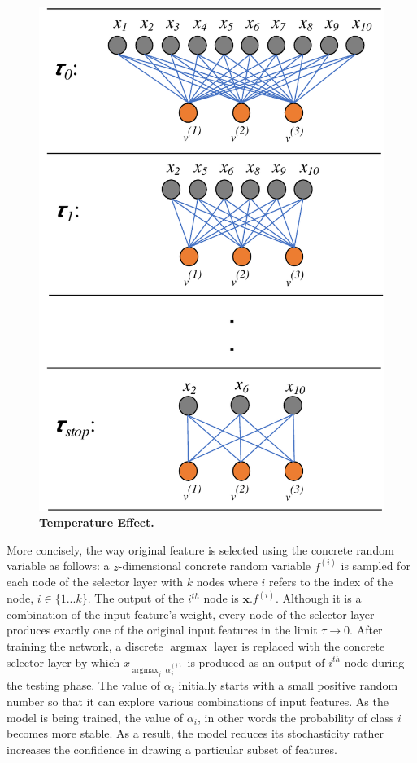 \documentclass{bioinfo}
\DeclareMathOperator*{\argmax}{argmax}
\begin{document}
\begin{figure}[hbt]
    \centering
    \includegraphics[scale=0.5]{fig/temp-change.pdf}
    \caption{\textbf{Temperature Effect.}  }
    \label{fig:temp-change}
\end{figure}
More concisely, the way original feature is selected using the concrete random variable as follows: a $z$-dimensional concrete random variable $f^{(i)}$ is sampled for each node of the selector layer with $k$ nodes where $i$ refers to the index of the node, $i \in \{1...k\}$. The output of the $i^{th}$ node is $ \textbf{x}.f^{(i)}$. Although it is a combination of the input feature's weight, every node of the selector layer produces exactly one of the original input features in the limit $\tau \to 0$. After training the network, a discrete $\argmax$ layer is replaced with the concrete selector layer by which $x_{\argmax_j \; \alpha_j^{(i)}}$ is produced as an output of $i^{th}$ node during the testing phase. The value of $\alpha_i$ initially starts with a small positive random number so that it can explore various combinations of input features. As the model is being trained, the value of $\alpha_i$, in other words the probability of class $i$ becomes more stable. As a result, the model reduces its stochasticity rather increases the confidence in drawing a particular subset of features. 
\end{document}
